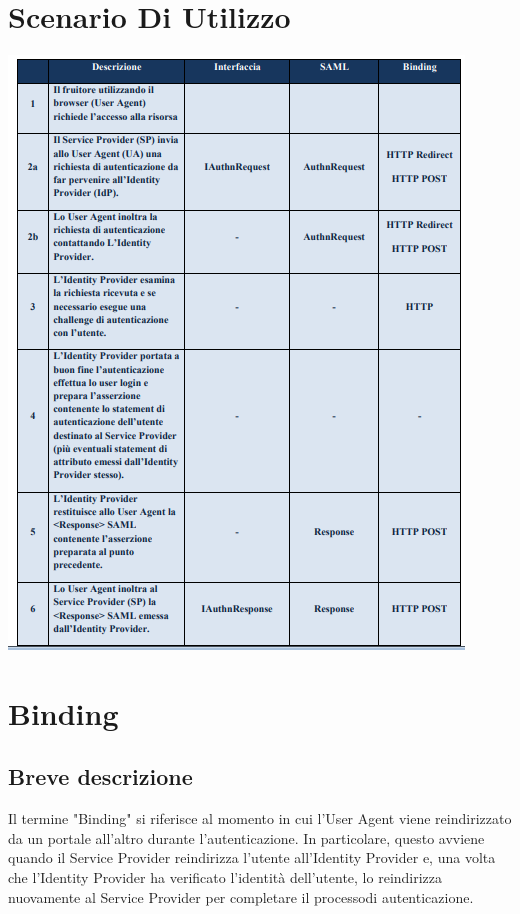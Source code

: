 \section{Scenario Di Utilizzo}
\begin{center}
	\includegraphics[scale = 1]{./res/images/ScenarioUsoSPID.PNG}
\end{center}

\pagebreak
\section{Binding}
\subsection{Breve descrizione}
Il termine "Binding" si riferisce al momento in cui l'User Agent viene reindirizzato da un portale all'altro durante l'autenticazione. 
In particolare, questo avviene quando il Service Provider reindirizza l'utente all'Identity Provider e, una volta che l'Identity 
Provider ha verificato l'identità dell'utente, lo reindirizza nuovamente al Service Provider per completare il processo\glo di 
autenticazione.
